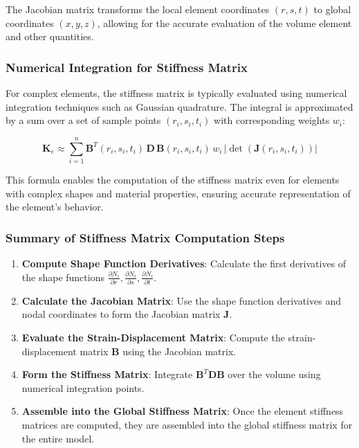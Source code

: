The Jacobian matrix transforms the local element coordinates \((r, s, t)\) to global coordinates \((x, y, z)\), allowing for the accurate evaluation of the volume element and other quantities.

\subsubsection{Numerical Integration for Stiffness Matrix}

For complex elements, the stiffness matrix is typically evaluated using numerical integration techniques such as Gaussian quadrature. The integral is approximated by a sum over a set of sample points \((r_i, s_i, t_i)\) with corresponding weights \( w_i \):

\[
\mathbf{K}_e \approx \sum_{i=1}^{n} \mathbf{B}^T(r_i, s_i, t_i) \, \mathbf{D} \, \mathbf{B}(r_i, s_i, t_i) \, w_i \, \left| \det(\mathbf{J}(r_i, s_i, t_i)) \right|
\]

This formula enables the computation of the stiffness matrix even for elements with complex shapes and material properties, ensuring accurate representation of the element's behavior.

\subsubsection{Summary of Stiffness Matrix Computation Steps}

\begin{enumerate}
    \item \textbf{Compute Shape Function Derivatives}: Calculate the first derivatives of the shape functions \( \frac{\partial N_i}{\partial r}, \frac{\partial N_i}{\partial s}, \frac{\partial N_i}{\partial t} \).
    \item \textbf{Calculate the Jacobian Matrix}: Use the shape function derivatives and nodal coordinates to form the Jacobian matrix \( \mathbf{J} \).
    \item \textbf{Evaluate the Strain-Displacement Matrix}: Compute the strain-displacement matrix \( \mathbf{B} \) using the Jacobian matrix.
    \item \textbf{Form the Stiffness Matrix}: Integrate \( \mathbf{B}^T \mathbf{D} \mathbf{B} \) over the volume using numerical integration points.
    \item \textbf{Assemble into the Global Stiffness Matrix}: Once the element stiffness matrices are computed, they are assembled into the global stiffness matrix for the entire model.
\end{enumerate}

